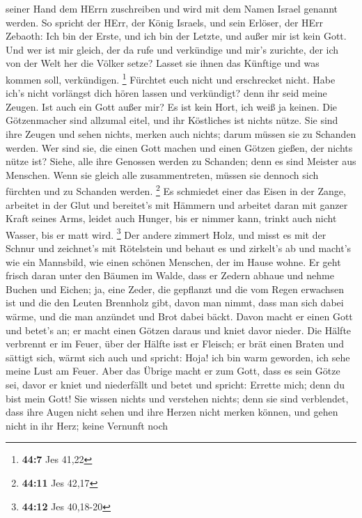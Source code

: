 seiner Hand dem HErrn zuschreiben und wird mit dem Namen Israel genannt
werden.  So spricht der HErr, der König Israels, und sein
Erlöser, der HErr Zebaoth: Ich bin der Erste, und ich bin der Letzte,
und außer mir ist kein Gott.  Und wer ist mir gleich, der da
rufe und verkündige und mir's zurichte, der ich von der Welt her die
Völker setze? Lasset sie ihnen das Künftige und was kommen soll,
verkündigen. \footnote{\textbf{44:7} Jes 41,22}  Fürchtet
euch nicht und erschrecket nicht. Habe ich's nicht vorlängst dich hören
lassen und verkündigt? denn ihr seid meine Zeugen. Ist auch ein Gott
außer mir? Es ist kein Hort, ich weiß ja keinen.  Die
Götzenmacher sind allzumal eitel, und ihr Köstliches ist nichts nütze.
Sie sind ihre Zeugen und sehen nichts, merken auch nichts; darum müssen
sie zu Schanden werden.  Wer sind sie, die einen Gott
machen und einen Götzen gießen, der nichts nütze ist? 
Siehe, alle ihre Genossen werden zu Schanden; denn es sind Meister aus
Menschen. Wenn sie gleich alle zusammentreten, müssen sie dennoch sich
fürchten und zu Schanden werden. \footnote{\textbf{44:11} Jes 42,17}
 Es schmiedet einer das Eisen in der Zange, arbeitet in der
Glut und bereitet's mit Hämmern und arbeitet daran mit ganzer Kraft
seines Arms, leidet auch Hunger, bis er nimmer kann, trinkt auch nicht
Wasser, bis er matt wird. \footnote{\textbf{44:12} Jes 40,18-20}
 Der andere zimmert Holz, und misst es mit der Schnur und
zeichnet's mit Rötelstein und behaut es und zirkelt's ab und macht's wie
ein Mannsbild, wie einen schönen Menschen, der im Hause wohne.
 Er geht frisch daran unter den Bäumen im Walde, dass er
Zedern abhaue und nehme Buchen und Eichen; ja, eine Zeder, die gepflanzt
und die vom Regen erwachsen ist  und die den Leuten
Brennholz gibt, davon man nimmt, dass man sich dabei wärme, und die man
anzündet und Brot dabei bäckt. Davon macht er einen Gott und betet's an;
er macht einen Götzen daraus und kniet davor nieder.  Die
Hälfte verbrennt er im Feuer, über der Hälfte isst er Fleisch; er brät
einen Braten und sättigt sich, wärmt sich auch und spricht: Hoja! ich
bin warm geworden, ich sehe meine Lust am Feuer.  Aber das
Übrige macht er zum Gott, dass es sein Götze sei, davor er kniet und
niederfällt und betet und spricht: Errette mich; denn du bist mein Gott!
 Sie wissen nichts und verstehen nichts; denn sie sind
verblendet, dass ihre Augen nicht sehen und ihre Herzen nicht merken
können,  und gehen nicht in ihr Herz; keine Vernunft noch
